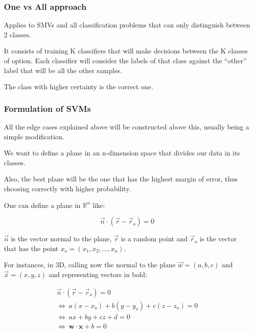 \subsubsection{One vs All approach}

Applies to SMVs and all classification problems that can only distinguish between 2 classes.

It consists of training K classifiers that will make decisions between the K classes of option. Each classifier will consider the labels of that class against the ``other'' label that will be all the other samples. 

The class with higher certainty is the correct one.




\subsubsection{Formulation of SVMs}

All the edge cases explained above will be constructed above this, usually being a simple modification.

We want to define a plane in an n-dimension space that divides our data in its classes.

Also, the best plane will be the one that has the highest margin of error, thus choosing correctly with higher probability.


One can define a plane in $\mathds{R}^n$ like:

\begin{equation}
    \vec{n} \cdot (\vec{r} - \vec{r}_o) = 0
\end{equation}

$\vec{n}$ is the vector normal to the plane, $\vec{r}$ is a random point and $\vec{r}_o$ is the vector that has the point $x_o = (x_1, x_2, \dots, x_n)$.

For instances, in 3D, calling now the normal to the plane $\vec{w} = (a,b,c)$ and $\vec{x} = (x,y,z)$ and representing vectors in bold:

\begin{gather}
    \vec{n} \cdot (\vec{r} - \vec{r}_o) = 0  \\
    \Leftrightarrow  \ a (x-x_o) + b (y-y_o) + c (z-z_o) = 0 \\
    \Leftrightarrow  \ a x + b y + c z + d = 0 \\
    \Leftrightarrow  \ \mathbf{w} \cdot \mathbf{x} + b = 0
\end{gather}


